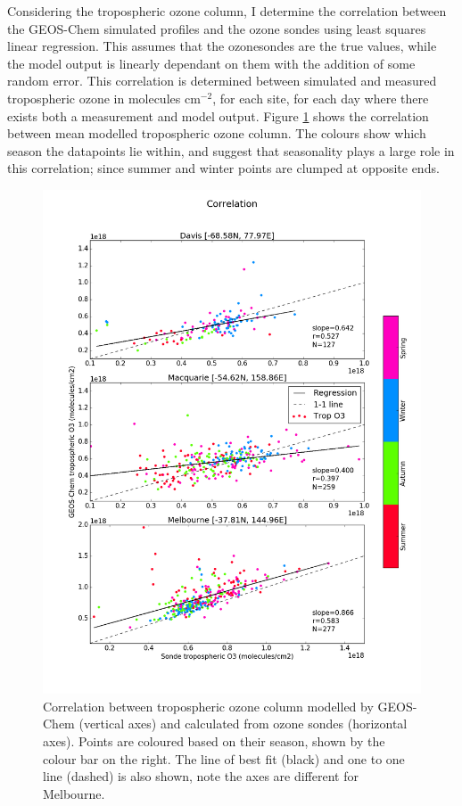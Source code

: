     Considering the tropospheric ozone column, I determine the correlation between the GEOS-Chem simulated profiles and the ozone sondes using least squares linear regression.
    This assumes that the ozonesondes are the true values, while the model output is linearly dependant on them with the addition of some random error.
    This correlation is determined between simulated and measured tropospheric ozone in molecules cm$^{-2}$, for each site, for each day where there exists both a measurement and model output.
    Figure \ref{ch_o3:fig:GEOSChemTroposphereCorrelation} shows the correlation between mean modelled tropospheric ozone column.
    The colours show which season the datapoints lie within, and suggest that seasonality plays a large role in this correlation; since summer and winter points are clumped at opposite ends.
    
    \begin{figure}[!htbp]
      \includegraphics[width=\textwidth]{Figures/Ozone/station_correlations.png}
      \caption{Correlation between tropospheric ozone column modelled by GEOS-Chem (vertical axes) and calculated from ozone sondes (horizontal axes). 
      Points are coloured based on their season, shown by the colour bar on the right.
      The line of best fit (black) and one to one line (dashed) is also shown, note the axes are different for Melbourne.}
      \label{ch_o3:fig:GEOSChemTroposphereCorrelation}
    \end{figure}
    

